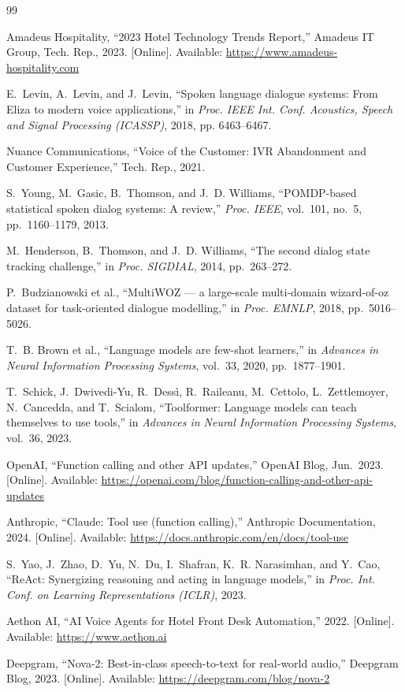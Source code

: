 \documentclass[conference]{IEEEtran}
\begin{document}
\begin{thebibliography}{99}

Amadeus Hospitality, ``2023 Hotel Technology Trends Report,'' Amadeus IT
Group, Tech. Rep., 2023. [Online]. Available:
\url{https://www.amadeus-hospitality.com}

E.~Levin, A.~Levin, and J.~Levin, ``Spoken language dialogue systems: From
Eliza to modern voice applications,'' in \emph{Proc. IEEE Int. Conf. Acoustics,
Speech and Signal Processing (ICASSP)}, 2018, pp. 6463--6467.

Nuance Communications, ``Voice of the Customer: IVR Abandonment and Customer
Experience,'' Tech. Rep., 2021.

S.~Young, M.~Gasic, B.~Thomson, and J.~D. Williams, ``POMDP-based statistical
spoken dialog systems: A review,'' \emph{Proc. IEEE}, vol.~101, no.~5,
pp.~1160--1179, 2013.

M.~Henderson, B.~Thomson, and J.~D. Williams, ``The second dialog state
tracking challenge,'' in \emph{Proc. SIGDIAL}, 2014, pp.~263--272.

P.~Budzianowski et al., ``MultiWOZ — a large-scale multi-domain wizard-of-oz
dataset for task-oriented dialogue modelling,'' in \emph{Proc. EMNLP}, 2018,
pp.~5016--5026.

T.~B. Brown et al., ``Language models are few-shot learners,'' in
\emph{Advances in Neural Information Processing Systems}, vol.~33,
2020, pp.~1877--1901.

T.~Schick, J.~Dwivedi-Yu, R.~Dess{\`{i}}, R.~Raileanu, M.~Cettolo,
L.~Zettlemoyer, N.~Cancedda, and T.~Scialom, ``Toolformer: Language models
can teach themselves to use tools,'' in \emph{Advances in Neural Information
Processing Systems}, vol.~36, 2023.

OpenAI, ``Function calling and other API updates,'' OpenAI Blog, Jun.~2023.
[Online]. Available: \url{https://openai.com/blog/function-calling-and-other-api-updates}

Anthropic, ``Claude: Tool use (function calling),'' Anthropic Documentation,
2024. [Online]. Available: \url{https://docs.anthropic.com/en/docs/tool-use}

S.~Yao, J.~Zhao, D.~Yu, N.~Du, I.~Shafran, K.~R. Narasimhan, and Y.~Cao,
``ReAct: Synergizing reasoning and acting in language models,'' in
\emph{Proc. Int. Conf. on Learning Representations (ICLR)}, 2023.

Aethon AI, ``AI Voice Agents for Hotel Front Desk Automation,'' 2022.
[Online]. Available: \url{https://www.aethon.ai}

Deepgram, ``Nova-2: Best-in-class speech-to-text for real-world audio,''
Deepgram Blog, 2023. [Online]. Available: \url{https://deepgram.com/blog/nova-2}

\end{thebibliography}
\end{document}
